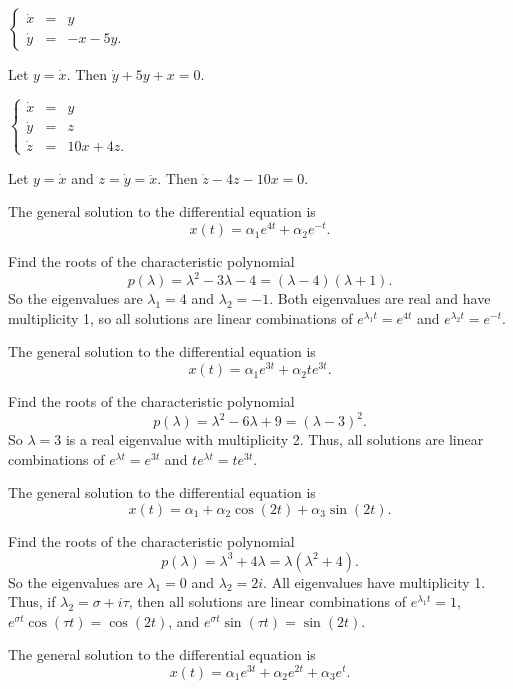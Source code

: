  \ans $\left\{\begin{array}{rcl} \dot{x} & = & y \\
\dot{y} & = & -x-5y. \end{array}\right.$

\soln  Let $y = \dot{x}$.  Then $\dot{y}+5y+x=0$.

 \ans $\left\{\begin{array}{rcl} \dot{x} & = & y \\
\dot{y} & = & z\\
\dot{z} & = & 10x+4z. \end{array}\right.$

\soln  Let $y = \dot{x}$ and $z=\dot{y}=\ddot{x}$.  Then 
$\dot{z}-4z-10x=0$.

\newpage
{} \ans The general solution to the differential equation is
\[
x(t) = \alpha_1e^{4t} + \alpha_2e^{-t}.
\]

\soln Find the roots of the characteristic polynomial
\[
p(\lambda) = \lambda^2 - 3\lambda - 4 = (\lambda - 4)(\lambda + 1).
\]
So the eigenvalues are $\lambda_1 = 4$ and $\lambda_2 = -1$.  Both eigenvalues
are real and have multiplicity 1, so all solutions are linear combinations of
$e^{\lambda_1 t} = e^{4t}$ and $e^{\lambda_2 t} = e^{-t}$.

 \ans The general solution to the differential equation is
\[
x(t) = \alpha_1e^{3t} + \alpha_2te^{3t}.
\]

\soln Find the roots of the characteristic polynomial
\[
p(\lambda) = \lambda^2 - 6\lambda + 9 = (\lambda - 3)^2.
\]
So $\lambda = 3$ is a real eigenvalue with multiplicity 2.  Thus, all
solutions are linear combinations of $e^{\lambda t} = e^{3t}$ and
$te^{\lambda t} = te^{3t}$.

 \ans The general solution to the differential equation is
\[
x(t) = \alpha_1 + \alpha_2\cos(2t) + \alpha_3\sin(2t).
\]

\soln Find the roots of the characteristic polynomial
\[
p(\lambda) = \lambda^3 + 4\lambda = \lambda(\lambda^2 + 4).
\]
So the eigenvalues are $\lambda_1 = 0$ and $\lambda_2 = 2i$.  All
eigenvalues have multiplicity 1.  Thus, if $\lambda_2 = \sigma + i\tau$, then
all solutions are linear combinations of $e^{\lambda_1 t} = 1$,
$e^{\sigma t}\cos(\tau t) = \cos(2t)$, and $e^{\sigma t}\sin(\tau t)
= \sin(2t)$.

 \ans The general solution to the differential equation is
\[
x(t) = \alpha_1e^{3t} + \alpha_2e^{2t} + \alpha_3e^t.
\]

